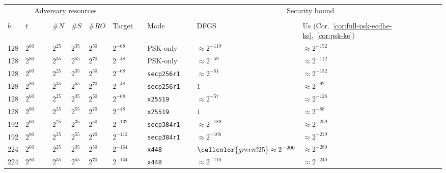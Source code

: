 \iffull
\else

	\begin{table}[t]
		\centering
		\small
		
		\renewcommand{\arraystretch}{0.001}
		\renewcommand{\tabcolsep}{0.15cm}
		\begin{tabular}{@{}llllllllllll@{}}
		\toprule
		 & \multicolumn{4}{c}{Adversary resources}	& & & & \multicolumn{2}{c}{Security bound}	\\
		 \cmidrule{2-5} \cmidrule{9-10} \\
		$b$ & $t$~~~~~	& $\#N$	& $\#S$ & $\#RO$ & Target  &&  Mode~~~~~~~ & DFGS\,{\scriptsize\cite{JC:DFGS21}}	& Us (Cor.~\ref{cor:full-psk-ecdhe-ke},~\ref{cor:psk-ke})	\\
		\midrule
	128 & $2^{60}$ & $2^{25}$ & $2^{35}$ & $2^{50}$ & $2^{-68}$ && PSK-only & \cellcolor{green!25}$\approx 2^{-119}$	& \cellcolor{green!25}$\approx 2^{-152}$	\\ 
	128 & $2^{80}$ & $2^{35}$ & $2^{55}$ & $2^{70}$ & $2^{-48}$ && PSK-only & \cellcolor{green!25}$\approx 2^{-59~}$	& \cellcolor{green!25}$\approx 2^{-112}$	\\ 
	\midrule
	128 & $2^{60}$ & $2^{25}$ & $2^{35}$ & $2^{50}$ & $2^{-68}$ && \texttt{secp256r1} & $\approx 2^{-61}$	& \cellcolor{green!25}$\approx 2^{-132}$	\\ 
	128 & $2^{80}$ & $2^{35}$ & $2^{55}$ & $2^{70}$ & $2^{-48}$ && \texttt{secp256r1} & $1$	& \cellcolor{green!25}$\approx 2^{-92~}$	\\ 
	\midrule
	128 & $2^{60}$ & $2^{25}$ & $2^{35}$ & $2^{50}$ & $2^{-68}$ && \texttt{x25519} & $\approx 2^{-57}$	& \cellcolor{green!25}$\approx 2^{-128}$	\\ 
	128 & $2^{80}$ & $2^{35}$ & $2^{55}$ & $2^{70}$ & $2^{-48}$ && \texttt{x25519} & $1$	&\cellcolor{green!25}$\approx 2^{-88~}$	\\ 
	\midrule
	192 & $2^{60}$ & $2^{25}$ & $2^{35}$ & $2^{50}$ & $2^{-132}$ && \texttt{secp384r1} & \cellcolor{green!25}$\approx 2^{-189}$ 	&\cellcolor{green!25}$\approx 2^{-259}$ 	\\ 
	192 & $2^{80}$ & $2^{35}$ & $2^{55}$ & $2^{70}$ & $2^{-112}$ && \texttt{secp384r1} & $\approx 2^{-108}$	&\cellcolor{green!25}$\approx 2^{-219}$ 	\\ 
	\midrule
	224 & $2^{60}$ & $2^{25}$ & $2^{35}$ & $2^{50}$ & $2^{-164}$ && \texttt{x448} & $\cellcolor{green!25}\approx 2^{-200}$ 	&\cellcolor{green!25}$\approx 2^{-280}$ 	\\ 
	224 & $2^{80}$ & $2^{35}$ & $2^{55}$ & $2^{70}$ & $2^{-144}$ && \texttt{x448} & $\approx 2^{-110}$	&\cellcolor{green!25}$\approx 2^{-240}$ 	\\ 

\end{tabular}
\end{table}

